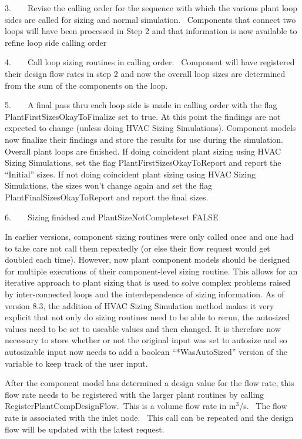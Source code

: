 3.~~~~Revise the calling order for the sequence with which the various plant loop sides are called for sizing and normal simulation.~ Components that connect two loops will have been processed in Step 2 and that information is now available to refine loop side calling order

4.~~~~Call loop sizing routines in calling order.~ Component will have registered their design flow rates in step 2 and now the overall loop sizes are determined from the sum of the components on the loop.

5.~~~~A final pass thru each loop side is made in calling order with the flag PlantFirstSizesOkayToFinalize set to true. At this point the findings are not expected to change (unless doing HVAC Sizing Simulations). Component models now finalize their findings and store the results for use during the simulation. Overall plant loops are finished. If doing coincident plant sizing using HVAC Sizing Simulations, set the flag PlantFirstSizesOkayToReport and report the ``Initial'' sizes. If not doing coincident plant sizing using HVAC Sizing Simulations, the sizes won't change again and set the flag PlantFinalSizesOkayToReport and report the final sizes.

6.~~~~Sizing finished and PlantSizeNotCompleteset FALSE

In earlier versions, component sizing routines were only called once and one had to take care not call them repeatedly (or else their flow request would get doubled each time). However, now plant component models should be designed for multiple executions of their component-level sizing routine. This allows for an iterative approach to plant sizing that is used to solve complex problems raised by inter-connected loops and the interdependence of sizing information. As of version 8.3, the addition of HVAC Sizing Simulation method makes it very explicit that not only do sizing routines need to be able to rerun, the autosized values need to be set to useable values and then changed. It is therefore now necessary to store whether or not the original input was set to autosize and so autosizable input now needs to add a boolean ``*WasAutoSized'' version of the variable to keep track of the user input.

After the component model has determined a design value for the flow rate, this flow rate needs to be registered with the larger plant routines by calling RegisterPlantCompDesignFlow.~This is a volume flow rate in m\(^{3}\)/s.~ The flow rate is associated with the inlet node.~ This call can be repeated and the design flow will be updated with the latest request.


